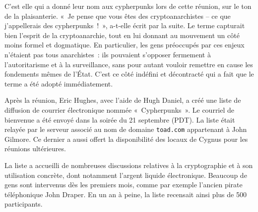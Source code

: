 C'est elle qui a donné leur nom aux cypherpunks lors de cette réunion, sur le ton de la plaisanterie. «~Je pense que vous êtes des cryptoanarchistes -- ce que j'appellerais des cypherpunks~!~», a-t-elle écrit par la suite. Le terme capturait bien l'esprit de la cryptoanarchie, tout en lui donnant au mouvement un côté moins formel et dogmatique. En particulier, les gens préoccupés par ces enjeux n'étaient pas tous anarchistes~: ils pouvaient s'opposer fermement à l'autoritarisme et à la surveillance, sans pour autant vouloir remettre en cause les fondements mêmes de l'État. C'est ce côté indéfini et décontracté qui a fait que le terme a été adopté immédiatement. %

Après la réunion, Eric Hughes, avec l'aide de Hugh Daniel, a créé une liste de diffusion de courrier électronique nommée «~Cypherpunks~». Le courriel de bienvenue a été envoyé dans la soirée du 21 septembre (PDT). La liste était relayée par le serveur associé au nom de domaine \texttt{toad.com} appartenant à John Gilmore. Ce dernier a aussi offert la disponibilité des locaux de Cygnus pour les réunions ultérieures.

La liste a accueilli de nombreuses discussions relatives à la cryptographie et à son utilisation concrète, dont notamment l'argent liquide électronique. Beaucoup de gens sont intervenus dès les premiers mois, comme par exemple l'ancien pirate téléphonique John Draper. En un an à peine, la liste recensait ainsi plus de 500 participants. %

